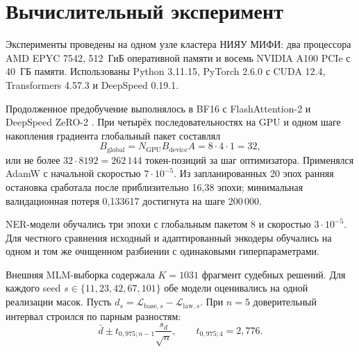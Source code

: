 \documentclass[12pt,a4paper]{article}
\begin{document}
\section{Вычислительный эксперимент}
Эксперименты проведены на одном узле кластера НИЯУ МИФИ: два процессора AMD EPYC 7542, 512~ГиБ оперативной памяти и восемь NVIDIA A100 PCIe с 40~ГБ памяти. Использованы Python 3.11.15, PyTorch 2.6.0 с CUDA 12.4, Transformers 4.57.3 и DeepSpeed 0.19.1.

Продолженное предобучение выполнялось в BF16 с FlashAttention-2 \cite{dao2023flashattention2} и DeepSpeed ZeRO-2 \cite{rajbhandari2020zero}. При четырёх последовательностях на GPU и одном шаге накопления градиента глобальный пакет составлял
\begin{equation}
 B_{\mathrm{global}}=N_{\mathrm{GPU}}B_{\mathrm{device}}A=8\cdot4\cdot1=32,
 \label{eq:batch}
\end{equation}
или не более $32\cdot8192=262\,144$ токен-позиций за шаг оптимизатора. Применялся AdamW \cite{loshchilov2019adamw} с начальной скоростью $7\cdot10^{-5}$. Из запланированных 20 эпох ранняя остановка сработала после приблизительно 16{,}38 эпохи; минимальная валидационная потеря 0{,}133617 достигнута на шаге 200\,000.

NER-модели обучались три эпохи с глобальным пакетом 8 и скоростью $3\cdot10^{-5}$. Для честного сравнения исходный и адаптированный энкодеры обучались на одном и том же очищенном разбиении с одинаковыми гиперпараметрами.

Внешняя MLM-выборка содержала $K=1031$ фрагмент судебных решений. Для каждого seed $s\in\{11,23,42,67,101\}$ обе модели оценивались на одной реализации масок. Пусть $d_s=\mathcal L_{\mathrm{base},s}-\mathcal L_{\mathrm{law},s}$. При $n=5$ доверительный интервал строился по парным разностям:
\begin{equation}
 \bar d\pm t_{0{,}975;n-1}\frac{s_d}{\sqrt n},\qquad t_{0{,}975;4}=2{,}776.
 \label{eq:ci}
\end{equation}
\end{document}
